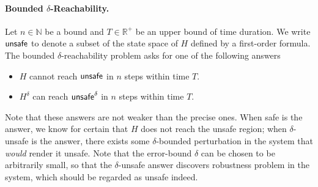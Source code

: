 \paragraph{Bounded $\delta$-Reachability.} Let $n\in \mathbb{N}$ be a bound and
$T\in \mathbb{R}^+$ be an upper bound of time duration. We write $\mathsf{unsafe}$ to denote a subset of
the state space of $H$ defined by a first-order formula. The bounded
$\delta$-reachability problem asks for one of the following answers
\begin{itemize}
 \item $H$ cannot reach $\mathsf{unsafe}$ in $n$ steps within time $T$.
 \item $H^{\delta}$ can reach $\mathsf{unsafe}^{\delta}$ in $n$ steps within time $T$.
\end{itemize}
Note that these answers are not weaker than the precise ones. When {\sf safe} is the answer, we know for certain
that $H$ does not reach the unsafe region; when {\sf $\delta$-unsafe} is the
answer, there exists some $\delta$-bounded perturbation in the
system that {\em would} render it unsafe. Note that the error-bound $\delta$ can
be chosen to be arbitrarily small, so that the {\sf$\delta$-unsafe} answer
discovers robustness problem in the system, which should be regarded as unsafe
indeed.


